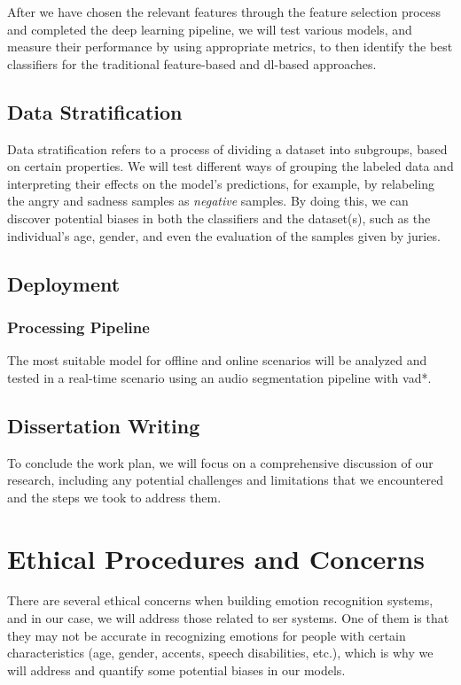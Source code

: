 After we have chosen the relevant features through the feature selection process and completed the deep learning pipeline, we will test various models, and measure their performance by using appropriate metrics, to then identify the best classifiers for the traditional feature-based and \ac{dl}-based approaches.


\subsection{Data Stratification}

Data stratification refers to a process of dividing a dataset into subgroups, based on certain properties. We will test different ways of grouping the labeled data and interpreting their effects on the model's predictions, for example, by relabeling the angry and sadness samples as \textit{negative} samples. By doing this, we can discover potential biases in both the classifiers and the dataset(s), such as the individual's age, gender, and even the evaluation of the samples given by juries.


\subsection{Deployment}

\subsubsection{Processing Pipeline}

The most suitable model for offline and online scenarios will be analyzed and tested in a real-time scenario using an audio segmentation pipeline with \ac{vad*}.

\subsection{Dissertation Writing}

To conclude the work plan, we will focus on a comprehensive discussion of our research, including any potential challenges and limitations that we encountered and the steps we took to address them.

\section{Ethical Procedures and Concerns}

There are several ethical concerns when building emotion recognition systems, and in our case, we will address those related to \ac{ser} systems. One of them is that they may not be accurate in recognizing emotions for people with certain characteristics (age, gender, accents, speech disabilities, etc.), which is why we will address and quantify some potential biases in our models.


